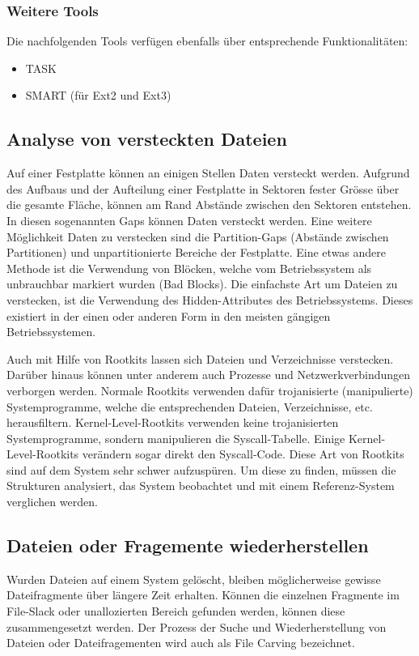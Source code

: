 \subsubsection{Weitere Tools}
Die nachfolgenden Tools verfügen ebenfalls über entsprechende Funktionalitäten:
\begin{itemize}
\item TASK
\item SMART (für Ext2 und Ext3)
\end{itemize}


\subsection{Analyse von versteckten Dateien}
Auf einer Festplatte können an einigen Stellen Daten versteckt werden. Aufgrund des Aufbaus und der Aufteilung einer Festplatte in Sektoren fester Grösse über die gesamte Fläche, können am Rand Abstände zwischen den Sektoren entstehen. In diesen sogenannten Gaps können Daten versteckt werden. Eine weitere Möglichkeit Daten zu verstecken sind die Partition-Gaps (Abstände zwischen Partitionen) und unpartitionierte Bereiche der Festplatte. Eine etwas andere Methode ist die Verwendung von Blöcken, welche vom Betriebssystem als unbrauchbar markiert wurden (Bad Blocks).  Die einfachste Art um Dateien zu verstecken, ist die Verwendung des Hidden-Attributes des Betriebssystems. Dieses existiert in der einen oder anderen Form in den meisten gängigen Betriebssystemen.

Auch mit Hilfe von Rootkits lassen sich Dateien und Verzeichnisse verstecken. Darüber hinaus können unter anderem auch Prozesse und Netzwerkverbindungen verborgen werden. Normale Rootkits verwenden dafür trojanisierte (manipulierte) Systemprogramme, welche die entsprechenden Dateien, Verzeichnisse, etc. herausfiltern. Kernel-Level-Rootkits verwenden keine trojanisierten Systemprogramme, sondern manipulieren die Syscall-Tabelle. Einige Kernel-Level-Rootkits verändern sogar direkt den Syscall-Code. Diese Art von Rootkits sind auf dem System sehr schwer aufzuspüren. Um diese zu finden, müssen die Strukturen analysiert, das System beobachtet und mit einem Referenz-System verglichen werden.



\subsection{Dateien oder Fragemente wiederherstellen}
Wurden Dateien auf einem System gelöscht, bleiben möglicherweise gewisse Dateifragmente über längere Zeit erhalten. Können die einzelnen Fragmente im File-Slack oder unallozierten Bereich gefunden werden, können diese zusammengesetzt werden. Der Prozess der Suche und Wiederherstellung von Dateien oder Dateifragementen wird auch als File Carving bezeichnet.

